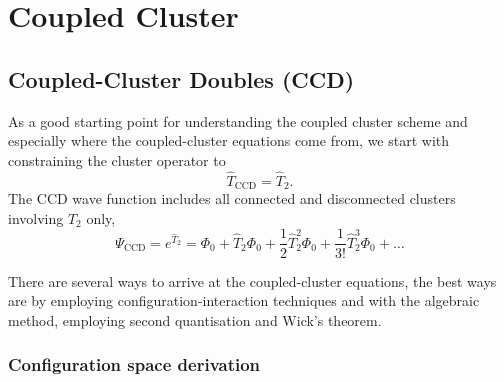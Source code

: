 \chapter{Coupled Cluster}

\section{Coupled-Cluster Doubles (CCD)}

As a good starting point for understanding the coupled cluster scheme and especially
where the coupled-cluster equations come from, we start with constraining the cluster
operator to
\begin{equation}
    \hat{T}_{\text{CCD}} = \hat{T}_2.
\end{equation}
The CCD wave function includes all connected and disconnected clusters involving
$\hat{T}_2$ only,
\begin{equation}
    \Psi_{\text{CCD}} = e^{\hat{T}_2} = \Phi_0 + \hat{T}_2\Phi_0 + \frac{1}{2}\hat{T}_2^2\Phi_0 
        + \frac{1}{3!}\hat{T}_2^3\Phi_0 + \dots
\end{equation}

There are several ways to arrive at the coupled-cluster equations, the best ways are
by employing configuration-interaction techniques and with the algebraic method,
employing second quantisation and Wick's theorem.

\subsection{Configuration space derivation}

